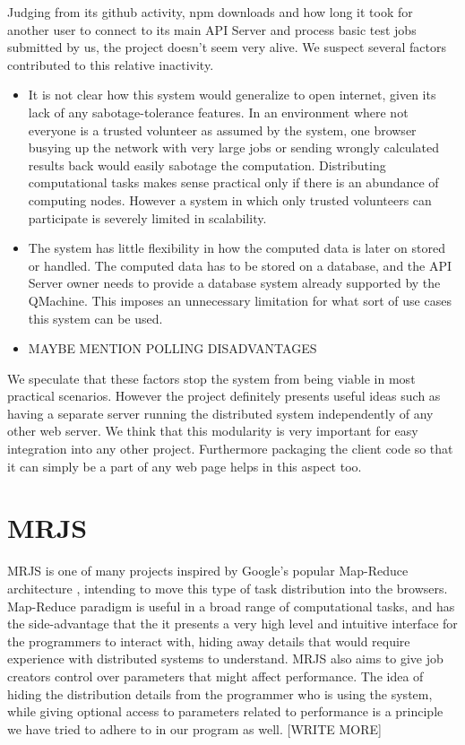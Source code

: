 Judging from its github activity, npm downloads and how long it took for another user to connect to its main API Server and process basic test jobs submitted by us, the project doesn't seem very alive. We suspect several factors contributed to this relative inactivity. 
\begin{itemize}
	\item It is not clear how this system would generalize to open internet, given its lack of any sabotage-tolerance features. In an environment where not everyone is a trusted volunteer as assumed by the system, one browser busying up the network with very large jobs or sending wrongly calculated results back would easily sabotage the computation. Distributing computational tasks makes sense practical only if there is an abundance of computing nodes. However a system in which only trusted volunteers can participate is severely limited in scalability.
	\item The system has little flexibility in how the computed data is later on stored or handled. The computed data has to be stored on a database, and the API Server owner needs to provide a database system already supported by the QMachine. This imposes an unnecessary limitation for what sort of use cases this system can be used.
	\item MAYBE MENTION POLLING DISADVANTAGES
\end{itemize}
We speculate that these factors stop the system from being viable in most practical scenarios. However the project definitely presents useful ideas such as having a separate server running the distributed system independently of any other web server. We think that this modularity is very important for easy integration into any other project. Furthermore packaging the client code so that it can simply be a part of any web page helps in this aspect too.

\section*{MRJS \cite{ryza2010mrjs}}
MRJS is one of many projects inspired by Google's popular Map-Reduce architecture \cite{62}, intending to move this type of task distribution into the browsers. Map-Reduce paradigm is useful in a broad range of computational tasks, and has the side-advantage that the it presents a very high level and intuitive interface for the programmers to interact with, hiding away details that would require experience with distributed systems to understand. MRJS also aims to give job creators control over parameters that might affect performance. The idea of hiding the distribution details from the programmer who is using the system, while giving optional access to parameters related to performance is a principle we have tried to adhere to in our program as well. [WRITE MORE]

